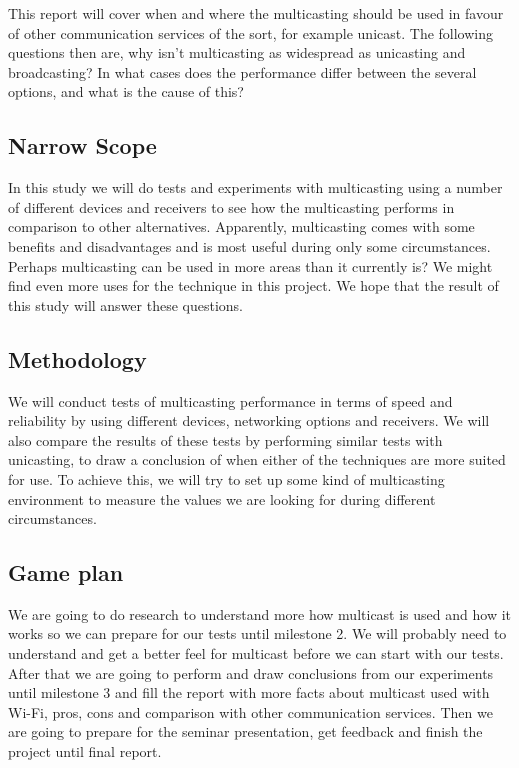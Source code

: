 \documentclass[9pt,a4paper]{acmproc}
\begin{document}
This report will cover when and where the multicasting should be used in favour of other communication services of the sort, for example unicast. The following questions then are, why isn't multicasting as widespread as unicasting and broadcasting? In what cases does the performance differ between the several options, and what is the cause of this?

\subsection{Narrow Scope}

In this study we will do tests and experiments with multicasting using a number of different devices and receivers to see how the multicasting performs in comparison to other alternatives. Apparently, multicasting comes with some benefits and disadvantages and is most useful during only some circumstances. Perhaps multicasting can be used in more areas than it currently is? We might find even more uses for the technique in this project. We hope that the result of this study will answer these questions.

\subsection{Methodology}

We will conduct tests of multicasting performance in terms of speed and reliability by using different devices, networking options and receivers. We will also compare the results of these tests by performing similar tests with unicasting, to draw a conclusion of when either of the techniques are more suited for use. To achieve this, we will try to set up some kind of multicasting environment to measure the values we are looking for during different circumstances.

\subsection{Game plan}

We are going to do research to understand more how multicast is used and how it works so we can prepare for our tests until milestone 2. We will probably need to understand and get a better feel for multicast before we can start with our tests. After that we are going to perform and draw conclusions from our experiments until milestone 3 and fill the report with more facts about multicast used with Wi-Fi, pros, cons and comparison with other communication services. Then we are going to prepare for the seminar presentation, get feedback and finish the project until final report.
\end{document}
